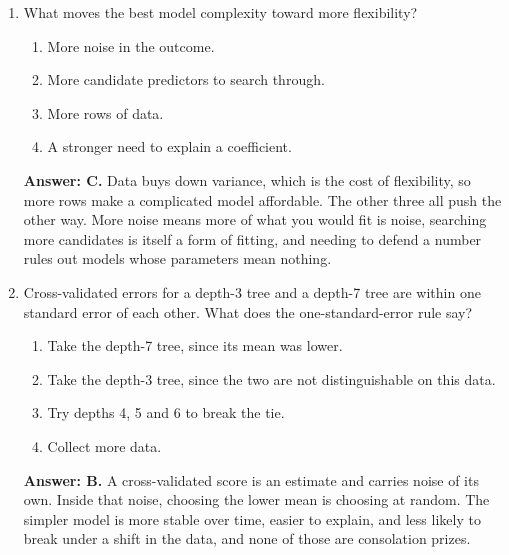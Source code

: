 \documentclass[11pt]{article}
\begin{document}
\begin{enumerate}[itemsep=14pt]
\vspace{2pt}
\textbf{Answer: B.} Bias measures being wrong in the same direction every time, and it decreases the whole way as the model gains flexibility. Variance measures being different every refit, and it increases the whole way. Neither curve has a bottom. Their sum does, and finding it is what cross-validation is for.
\vspace{4pt}

\item What moves the best model complexity toward more flexibility?

\begin{enumerate}[label=\Alph*., itemsep=1pt, topsep=3pt]
  \item More noise in the outcome.
  \item More candidate predictors to search through.
  \item More rows of data.
  \item A stronger need to explain a coefficient.
\end{enumerate}

\vspace{2pt}
\textbf{Answer: C.} Data buys down variance, which is the cost of flexibility, so more rows make a complicated model affordable. The other three all push the other way. More noise means more of what you would fit is noise, searching more candidates is itself a form of fitting, and needing to defend a number rules out models whose parameters mean nothing.
\vspace{4pt}

\item Cross-validated errors for a depth-3 tree and a depth-7 tree are within one standard error of each other. What does the one-standard-error rule say?

\begin{enumerate}[label=\Alph*., itemsep=1pt, topsep=3pt]
  \item Take the depth-7 tree, since its mean was lower.
  \item Take the depth-3 tree, since the two are not distinguishable on this data.
  \item Try depths 4, 5 and 6 to break the tie.
  \item Collect more data.
\end{enumerate}

\vspace{2pt}
\textbf{Answer: B.} A cross-validated score is an estimate and carries noise of its own. Inside that noise, choosing the lower mean is choosing at random. The simpler model is more stable over time, easier to explain, and less likely to break under a shift in the data, and none of those are consolation prizes.
\vspace{4pt}


\end{enumerate}
\end{document}
